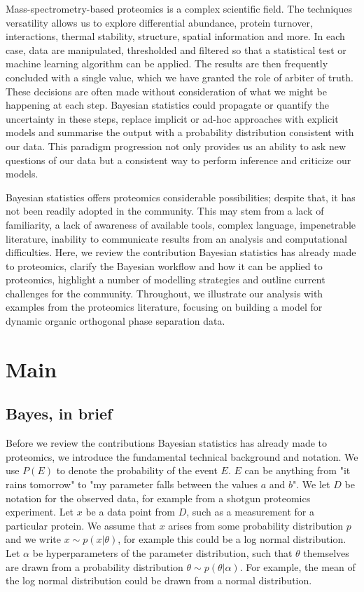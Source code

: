 \documentclass[12pt,english]{article}
\begin{document}
Mass-spectrometry-based proteomics is a complex scientific field. The techniques versatility allows us to explore differential abundance, protein turnover, interactions, thermal stability, structure, spatial information and more. In each case, data are manipulated, thresholded and filtered so that a statistical test or machine learning algorithm can be applied. The results are then frequently concluded with a single value, which we have granted the role of arbiter of truth. These decisions are often made without consideration of what we might be happening at each step. Bayesian statistics could propagate or quantify the uncertainty in these steps, replace implicit or ad-hoc approaches with explicit models and summarise the output with a probability distribution consistent with our data. This paradigm progression not only provides us an ability to ask new questions of our data but a consistent way to perform inference and criticize our models. 

Bayesian statistics offers proteomics considerable possibilities; despite that, it has not been readily adopted in the community. This may stem from a lack of familiarity, a lack of awareness of available tools, complex language, impenetrable literature, inability to communicate results from an analysis and computational difficulties. Here, we review the contribution Bayesian statistics has already made to proteomics, clarify the Bayesian workflow and how it can be applied to proteomics, highlight a number of modelling strategies and outline current challenges for the community. Throughout, we illustrate our analysis with examples from the proteomics literature, focusing on building a model for dynamic organic orthogonal phase separation data.
\section{Main}
\subsection{Bayes, in brief}
Before we review the contributions Bayesian statistics has already made to proteomics, we introduce the fundamental technical background and notation. We use $P(E)$ to denote the probability of the event $E$. $E$ can be anything from "it rains tomorrow" to "my parameter falls between the values $a$ and $b$". We let $D$ be notation for the observed data, for example from a shotgun proteomics experiment. Let $x$ be a data point from $D$, such as a measurement for a particular protein. We assume that $x$ arises from some probability distribution $p$ and we write $x \sim p(x|\theta)$, for example this could be a log normal distribution. Let $\alpha$ be hyperparameters of the parameter distribution, such that $\theta$ themselves are drawn from a probability distribution $\theta \sim p(\theta|\alpha)$. For example, the mean of the log normal distribution could be drawn from a normal distribution. 
\end{document}
